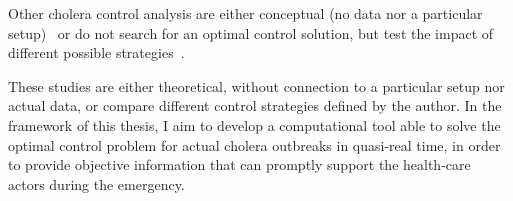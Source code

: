 Other cholera control analysis are either conceptual (no data nor a particular setup)~\cite{fister_optimal_2016} or do not search for an optimal control solution, but test the impact of different possible  strategies~\cite{kirpich_controlling_2017, eubank_modelling_2004, finger_potential_2018, seidlein_preventing_2018,azman_micro-hotspots_2018,lessler_mapping_2018,rebaudet_dry_2013}.

These studies are either theoretical, without connection to a particular setup nor actual data, or compare different control strategies defined by the author. In the framework of this thesis, I aim to develop a computational tool able to solve the optimal control problem for actual cholera outbreaks in quasi-real time, in order to provide objective information that can promptly support the health-care actors during the emergency. 





